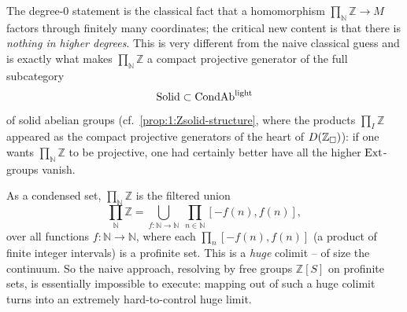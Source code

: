 The degree-$0$ statement is the classical fact that a homomorphism
$\prod_{\mathbb{N}}\mathbb{Z}\to M$ factors through finitely many coordinates; the
critical new content is that there is \emph{nothing in higher degrees}. This is
very different from the naive classical guess and is exactly what makes
$\prod_{\mathbb{N}}\mathbb{Z}$ a compact projective generator of the full
subcategory
\begin{equation*}
\mathrm{Solid}\subset\mathrm{CondAb}^{\mathrm{light}}
\end{equation*}
of solid abelian groups (cf.\ \cref{prop:1:Zsolid-structure}, where the products
$\prod_{I}\mathbb{Z}$ appeared as the compact projective generators of the heart
of $D(\mathbb{Z}_{\square})$): if one wants $\prod_{\mathbb{N}}\mathbb{Z}$ to be projective,
one had certainly better have all the higher $\operatorname{Ext}$-groups vanish.

\begin{remark}
\label{rmk:4:huge-colimit}
As a condensed set, $\prod_{\mathbb{N}}\mathbb{Z}$ is the filtered union
\begin{equation*}
\prod_{\mathbb{N}}\mathbb{Z}=\bigcup_{f\colon\mathbb{N}\to\mathbb{N}}\
\prod_{n\in\mathbb{N}}[-f(n),f(n)],
\end{equation*}
over all functions $f\colon\mathbb{N}\to\mathbb{N}$, where each
$\prod_{n}[-f(n),f(n)]$ (a product of finite integer intervals) is a profinite
set. This is a \emph{huge} colimit -- of size the continuum. So the naive
approach, resolving by free groups $\mathbb{Z}[S]$ on profinite sets, is
essentially impossible to execute: mapping out of such a huge colimit turns into
an extremely hard-to-control huge limit.
\end{remark}

